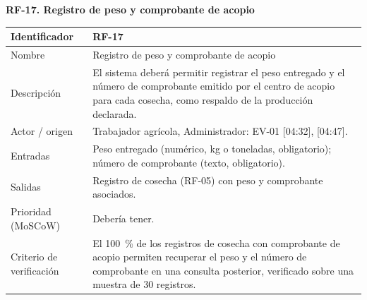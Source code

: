 \documentclass[12pt,a4paper]{article}
\begin{document}
\begin{minipage}{\linewidth}
\bigskip
\noindent\textbf{RF-17. Registro de peso y comprobante de acopio}
\label{tab:RF-17}

\begin{center}
\begin{tabular}{|p{3.5cm}|p{10.7cm}|}
\hline
Identificador & RF-17 \\
\hline
Nombre & Registro de peso y comprobante de acopio \\
\hline
Descripción & El sistema deberá permitir registrar el peso entregado y el número de comprobante emitido por el centro de acopio para cada cosecha, como respaldo de la producción declarada. \\
\hline
Actor / origen & Trabajador agrícola, Administrador: EV-01 [04:32], [04:47]. \\
\hline
Entradas & Peso entregado (numérico, kg o toneladas, obligatorio); número de comprobante (texto, obligatorio). \\
\hline
Salidas & Registro de cosecha (RF-05) con peso y comprobante asociados. \\
\hline
Prioridad (MoSCoW) & Debería tener. \\
\hline
Criterio de verificación & El 100~\% de los registros de cosecha con comprobante de acopio permiten recuperar el peso y el número de comprobante en una consulta posterior, verificado sobre una muestra de 30 registros. \\
\hline
\end{tabular}
\end{center}
\end{minipage}
\end{document}
